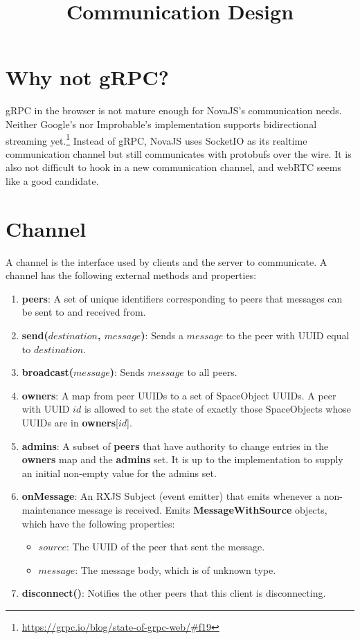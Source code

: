 \documentclass{article}
\title{Communication Design}
\begin{document}
\maketitle

\section{Why not gRPC?}

gRPC in the browser is not mature enough for NovaJS's communication needs. Neither Google's nor Improbable's implementation supports bidirectional streaming yet.\footnote{\url{https://grpc.io/blog/state-of-grpc-web/\#f19}} Instead of gRPC, NovaJS uses SocketIO as its realtime communication channel but still communicates with protobufs over the wire. It is also not difficult to hook in a new communication channel, and webRTC seems like a good candidate.

\section{Channel}
A channel is the interface used by clients and the server to communicate. A channel has the following external methods and properties:
\begin{enumerate}
\item \textbf{peers}: A set of unique identifiers corresponding to peers that messages can be sent to and received from.
\item \textbf{send($destination$, $message$)}: Sends a $message$ to the peer with UUID equal to $destination$.
\item \textbf{broadcast($message$)}: Sends $message$ to all peers.
\item \textbf{owners}: A map from peer UUIDs to a set of SpaceObject UUIDs. A peer with UUID $id$ is allowed to set the state of exactly those SpaceObjects whose UUIDs are in \textbf{owners}[$id$].
\item \textbf{admins}: A subset of \textbf{peers} that have authority to change entries in the \textbf{owners} map and the \textbf{admins} set. It is up to the implementation to supply an initial non-empty value for the admins set.
\item \textbf{onMessage}: An RXJS Subject (event emitter) that emits whenever a non-maintenance message is received. Emits \textbf{MessageWithSource} objects, which have the following properties:
  \begin{itemize}
  \item $source$: The UUID of the peer that sent the message.
  \item $message$: The message body, which is of unknown type.
  \end{itemize}
  
\item \textbf{disconnect()}: Notifies the other peers that this client is disconnecting.
\end{enumerate}
\end{document}

